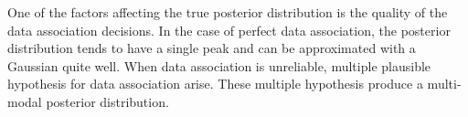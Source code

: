 One of the factors affecting the true posterior distribution is the
quality of the data association decisions. In the case of perfect data
association, the posterior distribution tends to have a single peak
and can be approximated with a Gaussian quite well. When data
association is unreliable, multiple plausible hypothesis for data
association arise. These multiple hypothesis produce a multi-modal
posterior distribution. 

\begin{figure}
\begin{center}
\\
\quad\space
{}
\end{center}
\end{figure}
